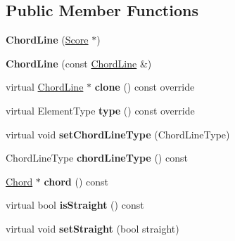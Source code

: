 \subsection*{Public Member Functions}
\begin{DoxyCompactItemize}
\item 
\mbox{\label{class_ms_1_1_chord_line_a623fe2b2215cfe9929677f5bfddc7dec}} 
{\bfseries Chord\+Line} (\hyperlink{class_ms_1_1_score}{Score} $\ast$)
\item 
\mbox{\label{class_ms_1_1_chord_line_ab24a298aa941312011a7e042fc7dda32}} 
{\bfseries Chord\+Line} (const \hyperlink{class_ms_1_1_chord_line}{Chord\+Line} \&)
\item 
\mbox{\label{class_ms_1_1_chord_line_aa6e0de76da3c0eb4a9d2d00f18598c92}} 
virtual \hyperlink{class_ms_1_1_chord_line}{Chord\+Line} $\ast$ {\bfseries clone} () const override
\item 
\mbox{\label{class_ms_1_1_chord_line_aa8d357b058f9ede8107ac4fd3e65484d}} 
virtual Element\+Type {\bfseries type} () const override
\item 
\mbox{\label{class_ms_1_1_chord_line_a3a0fad043b2ec2a3f8ef5da7425a29fc}} 
virtual void {\bfseries set\+Chord\+Line\+Type} (Chord\+Line\+Type)
\item 
\mbox{\label{class_ms_1_1_chord_line_ad9476d681ba92a473f1403aa5fb0c99e}} 
Chord\+Line\+Type {\bfseries chord\+Line\+Type} () const
\item 
\mbox{\label{class_ms_1_1_chord_line_aa02702478f2c2dbfb43e3fa07a395667}} 
\hyperlink{class_ms_1_1_chord}{Chord} $\ast$ {\bfseries chord} () const
\item 
\mbox{\label{class_ms_1_1_chord_line_ad708e296876017844fd6ecb802d4e5db}} 
virtual bool {\bfseries is\+Straight} () const
\item 
\mbox{\label{class_ms_1_1_chord_line_a30531d8b90157d822c9c7cff46877887}} 
virtual void {\bfseries set\+Straight} (bool straight)

\end{DoxyCompactItemize}
